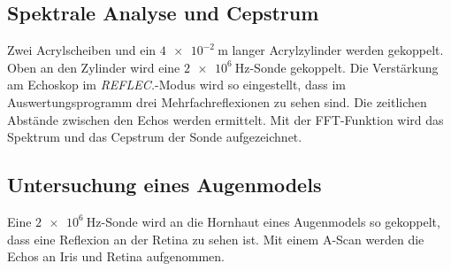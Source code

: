 \subsection{Spektrale Analyse und Cepstrum}
Zwei Acrylscheiben und ein $\SI{4e-2}{\metre}$ langer Acrylzylinder werden gekoppelt. Oben an den Zylinder wird eine $\SI{2e6}{\hertz}$-Sonde gekoppelt.
Die Verstärkung am Echoskop im \textit{REFLEC.}-Modus wird so eingestellt, dass im Auswertungsprogramm drei Mehrfachreflexionen zu sehen sind. Die zeitlichen Abstände zwischen den Echos werden ermittelt. Mit der FFT-Funktion wird das Spektrum und das Cepstrum der Sonde aufgezeichnet.

\subsection{Untersuchung eines Augenmodels}
Eine $\SI{2e6}{\hertz}$-Sonde wird an die Hornhaut eines Augenmodels so gekoppelt, dass eine Reflexion an der Retina zu sehen ist. Mit einem A-Scan werden die Echos an Iris und Retina aufgenommen.